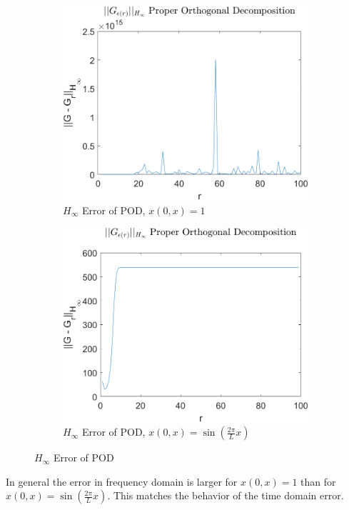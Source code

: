 \begin{figure}[H]
\begin{subfigure}[b]{0.5\textwidth}
\centering
\includegraphics[width=\textwidth]{images/freq/H_POD}
\caption{$H_{\infty}$ Error of POD, $x(0, x) = 1$}
\label{FIG-H-POD}
\end{subfigure}
\begin{subfigure}[b]{0.5\textwidth}
\centering
\includegraphics[width=\textwidth]{images/freq/H_POD_SIN}
\caption{$H_{\infty}$ Error of POD, $x(0, x) =  \sin(\frac{2\pi}{L}x)$}
\label{FIG-H-POD-SIN}
\end{subfigure}
\caption{$H_{\infty}$ Error of POD}
\label{FIG-H-POD-1}
\end{figure}
In general the error in frequency domain is larger for \(x(0, x) = 1\) than for \(x(0, x) =  \sin(\frac{2\pi}{L}x)\). 
This matches the behavior of the time domain error.

